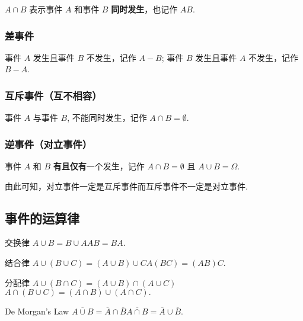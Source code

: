 \documentclass[12pt, a4paper, oneside, UTF8]{ctexbook}
\begin{document}
\begin{defn}
    \(A \cap B\) 表示事件 \(A\) 和事件 \(B\) \textbf{同时发生}，也记作 \(AB\).
\end{defn}

\subsubsection{差事件}
\begin{defn}
    事件 \(A\) 发生且事件 \(B\) 不发生，记作 \(A - B\);
    事件 \(B\) 发生且事件 \(A\) 不发生，记作 \(B - A\).
\end{defn}

\subsubsection{互斥事件（互不相容）}

\begin{defn}
    事件 \(A\) 与事件 \(B\), 不能同时发生，记作 \(A \cap B = \emptyset\).
\end{defn}

\subsubsection{逆事件（对立事件）}
\begin{defn}
    事件 \(A\) 和 \(B\) \textbf{有且仅有}一个发生，记作 \(A \cap B = \emptyset\) 且 \(A \cup B = \Omega\).
\end{defn}

\begin{rmk}
    由此可知，对立事件一定是互斥事件而互斥事件不一定是对立事件.
\end{rmk}

\subsection{事件的运算律}

\begin{thm}{交换律}
    \(A \cup B = B \cup A\)\qquad \(AB = BA\).
\end{thm}
\begin{thm}{结合律}
    \(A \cup \left(B \cup C\right) = \left(A \cup B\right) \cup C\)\qquad \(A\left(BC\right) = \left(AB\right)C\).
\end{thm}
\begin{thm}{分配律}
    \(A \cup \left(B \cap C\right) = \left(A \cup B\right) \cap \left(A \cup C\right)\)\qquad \(A \cap \left(B \cup C\right) = \left(A \cap B\right) \cup \left(A \cap C\right).\)
\end{thm}
\begin{thm}{De Morgan's Law}
    \(\overline{A \cup B } = \overline{A} \cap \overline{B}\)\qquad \(\overline{A \cap B} = \overline{A} \cup \overline{B}.\)
\end{thm}
\end{document}
